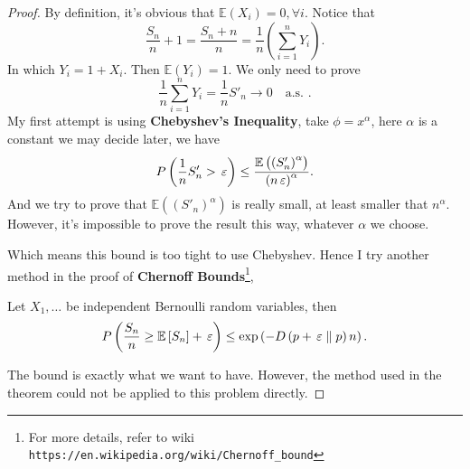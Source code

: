 \begin{proof}
		By definition, it's obvious that $\mathbb{E} \left( X_{i} \right) = 0,\forall i$.
		Notice that 
		\[
				\frac{S_n}{n}+1 =  \frac{S_n + n}{n} = 
				\frac{1}{n}\left( \sum_{i=1}^{n} Y_{i} \right) 
		.\] 
		In which $Y_{i} = 1 + X_{i}$. Then 
		$\mathbb{E}\left( Y_{i} \right) = 1$. We only need to prove
		\[
		\frac{1}{n} \sum_{i=1}^{n} Y_{i}= \frac{1}{n}S'_{n} \to 0 \quad \text{a.s. }
		.\] 
		My first attempt is using \textbf{Chebyshev's Inequality}, 
		take $\phi=x^{\alpha }$, here 
		$\alpha $ is a constant we may decide later, we have 
		\[
				P\left( \frac{1}{n} S'_{n} > \,\varepsilon \right) 
				\le \frac{\mathbb{E} \left( \left( S'_{n} \right) ^{\alpha } \right)  }{ \left( n\,\varepsilon \right) ^{ \alpha  } }
		.\] 
		And we try to prove that $\mathbb{E} \left( \left( S'_{n} \right) ^{\alpha } \right) $ is really small, at least smaller that $n^{\alpha }$. 
However, it's impossible to prove the result this way, whatever $\alpha $ we choose.

		Which means this bound is too tight to use Chebyshev. Hence I try another
		method in the proof of \textbf{Chernoff Bounds}\footnote{For more details, 
refer to wiki \texttt{https://en.wikipedia.org/wiki/Chernoff\_bound} }, 
		\begin{thm}
				Let $X_1,\ldots$ be independent Bernoulli random variables, 
				then 
				\[
						P\left( \frac{S_n}{n} \ge \mathbb{E}\left[ S_n \right] + \,\varepsilon \right) \le \exp\left( -D\left( p+\,\varepsilon \parallel p \right) n \right) 
				.\] 
		\end{thm}
The bound is exactly what we want to have. However, the method used in the theorem 
could not be applied to this problem directly.


\end{proof}

